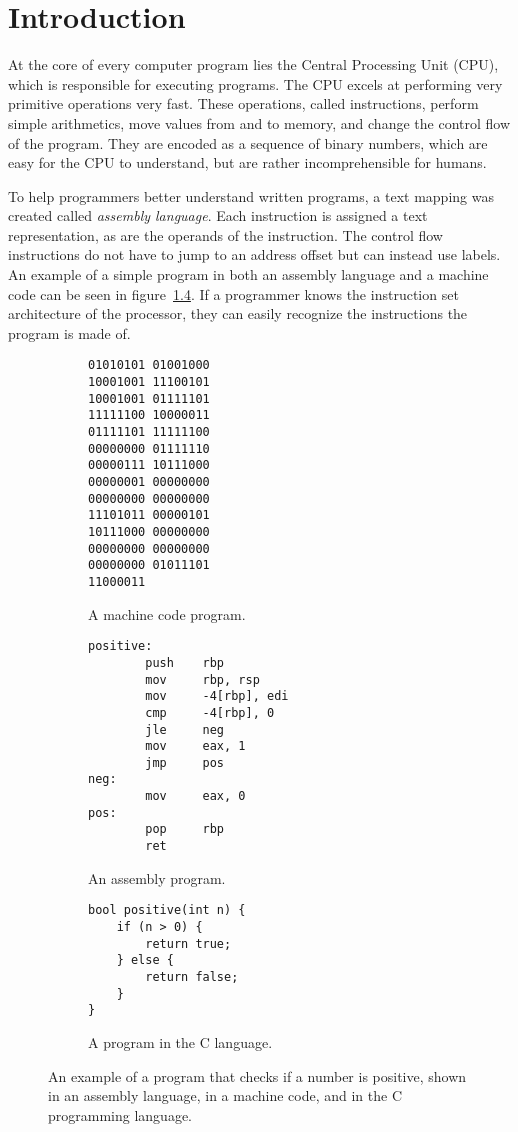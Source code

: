 \chapter{Introduction}
At the core of every computer program lies the Central Processing Unit (CPU),
which is responsible for executing programs. The CPU excels at performing very
primitive operations very fast. These operations, called instructions, perform
simple arithmetics, move values from and to memory, and change the control flow
of the program. They are encoded as a sequence of binary numbers, which are
easy for the CPU to understand, but are rather incomprehensible for humans.

To help programmers better understand written programs, a text mapping was
created called \textit{assembly language}. Each instruction is assigned a text
representation, as are the operands of the instruction. The control flow
instructions do not have to jump to an address offset but can instead use
labels. An example of a simple program in both an assembly language and a
machine code can be seen in figure~\ref{fig:simple-assembly}. If a programmer
knows the instruction set architecture of the processor, they can easily
recognize the instructions the program is made of.

\begin{figure}
    \begin{subfigure}{1.0\textwidth}
        \begin{lstlisting}
01010101 01001000
10001001 11100101
10001001 01111101
11111100 10000011
01111101 11111100
00000000 01111110
00000111 10111000
00000001 00000000
00000000 00000000
11101011 00000101
10111000 00000000
00000000 00000000
00000000 01011101
11000011
        \end{lstlisting}
        \caption{A machine code program.}
        \label{subfig:machine-code}
    \end{subfigure}
    \begin{subfigure}{1.0\textwidth}
        \begin{lstlisting}
positive:
        push    rbp
        mov     rbp, rsp
        mov     -4[rbp], edi
        cmp     -4[rbp], 0
        jle     neg
        mov     eax, 1
        jmp     pos
neg:
        mov     eax, 0
pos:
        pop     rbp
        ret
        \end{lstlisting}
        \caption{An assembly program.}
        \label{subfig:assembly}
    \end{subfigure}\vspace{0.5cm}
    \begin{subfigure}{1.0\textwidth}
        \begin{verbatim}
bool positive(int n) {
    if (n > 0) {
        return true;
    } else {
        return false;
    }
}
        \end{verbatim}
        \caption{A program in the C language.}
        \label{subfig:c}
    \end{subfigure}
    \vspace{0.5cm}
    \caption{An example of a program that checks if a number is positive, shown
    in an assembly language, in a machine code, and in the C programming
    language.}
    \label{fig:simple-assembly}
\end{figure}

